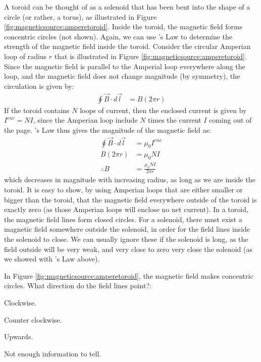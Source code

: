 A toroid can be thought of as a solenoid that has been bent into the shape of a circle (or rather, a torus), as illustrated in Figure \ref{fig:magneticsource:amperetoroid}. Inside the toroid, the magnetic field forms concentric circles (not shown). 
Again, we can use \ampere's Law to determine the strength of the magnetic field inside the toroid. Consider the circular Amperian loop of radius $r$ that is illustrated in Figure \ref{fig:magneticsource:amperetoroid}. Since the magnetic field is parallel to the Amperial loop everywhere along the loop, and the magnetic field does not change magnitude (by symmetry), the circulation is given by:
\begin{align*}
\oint \vec B \cdot d\vec l &= B (2\pi r)
\end{align*}
If the toroid contains $N$ loops of current, then the enclosed current is given by $I^{enc}=NI$, since the Amperian loop include $N$ times the current $I$ coming out of the page. \ampere's Law thus gives the magnitude of the magnetic field as:
\begin{align*}
\oint \vec B \cdot d\vec l &=\mu_0 I^{enc}\\
B (2\pi r) &= \mu_0 NI\\
\therefore B&=\frac{\mu_0 NI}{2\pi r}
\end{align*}
which decreases in magnitude with increasing radius, as long as we are inside the toroid. It is easy to show, by using Amperian loops that are either smaller or bigger than the toroid, that the magnetic field everywhere outside of the toroid is exactly zero (as those Amperian loops will enclose no net current). In a toroid, the magnetic field lines form closed circles. For a solenoid, there must exist a magnetic field somewhere outside the solenoid, in order for the field lines inside the solenoid to close. We can usually ignore these if the solenoid is long, as the field outside will be very weak, and very close to zero very close the solenoid (as we showed with \ampere's Law above). 

\begin{checkpoint}{}
	\begin{MCquestion}{In Figure \ref{fig:magneticsource:amperetoroid}, the magnetic field makes concentric circles. What direction do the field lines point?:}
		\item Clockwise.
		\item Counter clockwise. \correct
		\item Upwards.
		\item Not enough information to tell.
	\end{MCquestion}
\end{checkpoint}

